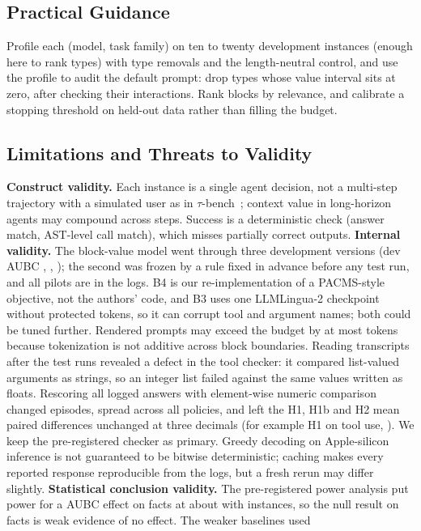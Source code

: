 \subsection{Practical Guidance}
Profile each (model, task family) on ten to twenty development instances (enough here to rank types) with type removals
and the length-neutral control, and use the profile to audit the default prompt: drop types whose value interval sits at
zero, after checking their interactions. Rank blocks by relevance, and calibrate a stopping threshold on held-out data
rather than filling the budget.

\subsection{Limitations and Threats to Validity}
\textbf{Construct validity.} Each instance is a single agent decision, not a multi-step trajectory with a simulated
user as in $\tau$-bench~\citep{taubench2024}; context value in long-horizon agents may compound across steps. Success is a deterministic check (answer match, AST-level call match),
which misses partially correct outputs.
\textbf{Internal validity.} The block-value model went through three development versions (dev AUBC \RDevAubcOne,
\RDevAubcTwo, \RDevAubcThree); the second was frozen by a rule fixed in advance before any test run, and all pilots are in
the logs. B4 is our re-implementation of a PACMS-style objective, not the authors' code, and B3 uses one
LLMLingua-2 checkpoint without protected tokens, so it can corrupt tool and argument names; both could be tuned further. Rendered prompts may exceed the budget by at most \RMaxOvershoot
tokens because tokenization is not additive across block boundaries. Reading transcripts after the test runs revealed a defect in the tool checker: it compared list-valued arguments as
strings, so an integer list failed against the same values written as floats. Rescoring all logged answers with
element-wise numeric comparison changed \RCheckerFlips episodes, spread across all policies, and left the H1, H1b and H2
mean paired differences unchanged at three decimals (for example H1 on tool use, \RSensHOneTool). We keep the
pre-registered checker as primary. Greedy decoding on Apple-silicon inference is not
guaranteed to be bitwise deterministic; caching makes every reported response reproducible from the logs, but a fresh
rerun may differ slightly.
\textbf{Statistical conclusion validity.} The pre-registered power analysis put power for a \RSesoi{} AUBC effect on facts at
about \RPowerFacts with \RNMain instances, so the null result on facts is weak evidence of no effect. The weaker baselines used
